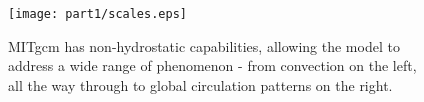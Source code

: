 \begin{figure}
\begin{center}
   \texttt{[image: part1/scales.eps]}
\end{center}
\caption{MITgcm has non-hydrostatic capabilities, allowing
the model to address a wide range of phenomenon - from convection
on the left, all the way through to global circulation patterns on the 
right.
}
\label{fig:all-scales}
\end{figure}
